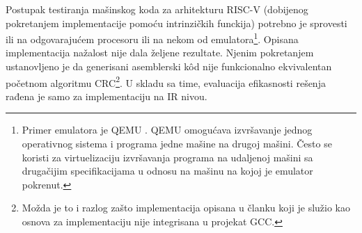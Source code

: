\documentclass[12pt,oneside]{memoir}
\begin{document}

Postupak testiranja mašinskog koda za arhitekturu RISC-V (dobijenog pokretanjem implementacije pomoću intrinzičkih funckija) potrebno je sprovesti ili na odgovarajućem procesoru ili na nekom od emulatora\footnote{Primer emulatora je QEMU \cite{qemu}. QEMU omogućava izvršavanje jednog operativnog sistema i programa jedne mašine na drugoj mašini. Često se koristi za virtuelizaciju izvršavanja programa na udaljenoj mašini sa drugačijim specifikacijama u odnosu na mašinu na kojoj je emulator pokrenut.}. Opisana implementacija nažalost nije dala željene rezultate. Njenim pokretanjem ustanovljeno je da generisani asemblerski k\^od nije funkcionalno ekvivalentan početnom algoritmu CRC\footnote{Možda je to i razlog zašto implementacija opisana u članku koji je služio kao osnova za implementaciju nije integrisana u projekat GCC.}.  U skladu sa time, evaluacija efikasnosti rešenja rađena je samo za implementaciju na IR nivou. 

\end{document}

